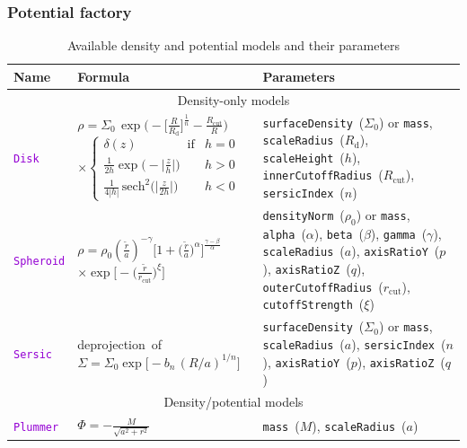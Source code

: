 \documentclass[12pt]{article}
\newcommand{\ttt}[1]{\textcolor{darkviolet}{\texttt{#1}}}
\newcommand{\ppp}[1]{\textcolor{darkolive} {\texttt{#1}}}
\begin{document}
\subsubsection{Potential factory}  \label{sec:PotentialFactory}

\begin{table}
\caption{Available density and potential models and their parameters}  \label{tab:PotentialParams}
\begin{tabular}{l m{5cm} >{\raggedright\arraybackslash}m{7cm}}
Name & Formula & Parameters \\
\hline
\multicolumn{3}{c}{Density-only models} \\[2mm]

\ttt{Disk} & $\rho = \Sigma_0\,\exp\big(-\big[\frac{R}{R_\mathrm{d}}\big]^{\frac1n} - \frac{R_\mathrm{cut}}{R}\big)$
$\times\left\{ \begin{array}{ll} \delta(z)\qquad\qquad\mbox{if} & h=0 \\[1mm]
\frac{1}{2h} \exp\big(-\big|\frac{z}{h}\big|\big) & h>0 \\[1mm]
\frac{1}{4|h|}\, \mathrm{sech}^2\big(\big|\frac{z}{2h}\big|\big) & h<0 \end{array} \right. $ &
\ppp{surfaceDensity}~($\Sigma_0$) or \ppp{mass}, \ppp{scaleRadius}~($R_\mathrm{d}$), \ppp{scaleHeight}~($h$), \ppp{innerCutoffRadius}~($R_\mathrm{cut}$), \ppp{sersicIndex}~($n$)\\

\ttt{Spheroid} & $\rho = \rho_0  \left(\frac{\tilde r}{a}\right)^{-\gamma} \Big[ 1 + \big(\frac{\tilde r}{a}\big)^\alpha \Big]^{\frac{\gamma-\beta}{\alpha}}$ $\times \exp\Big[ -\big(\frac{\tilde r}{r_\mathrm{cut}}\big)^\xi\Big] $ &
\ppp{densityNorm}~($\rho_0$) or \ppp{mass}, \ppp{alpha}~($\alpha$), \ppp{beta}~($\beta$), \ppp{gamma}~($\gamma$), \ppp{scaleRadius}~($a$), \ppp{axisRatioY}~($p$), \ppp{axisRatioZ}~($q$), \ppp{outerCutoffRadius}~($r_\mathrm{cut}$), \ppp{cutoffStrength}~($\xi$) \\[2mm]

\ttt{Sersic} & \mbox{deprojection of} \mbox{$\Sigma = \Sigma_0 \exp\big[-b_n\,(R/a)^{1/n}\big]$} & \ppp{surfaceDensity}~($\Sigma_0$) or \ppp{mass}, \ppp{scaleRadius}~($a$), \ppp{sersicIndex}~($n$), \ppp{axisRatioY}~($p$), \ppp{axisRatioZ}~($q$) \\[2mm]

\multicolumn{3}{c}{Density/potential models} \\[2mm]

\ttt{Plummer} & $\Phi = -\frac{M}{\sqrt{a^2+r^2}}$ & \ppp{mass}~($M$), \ppp{scaleRadius}~($a$) \\[2mm]


\end{tabular}
\end{table}
\end{document}
